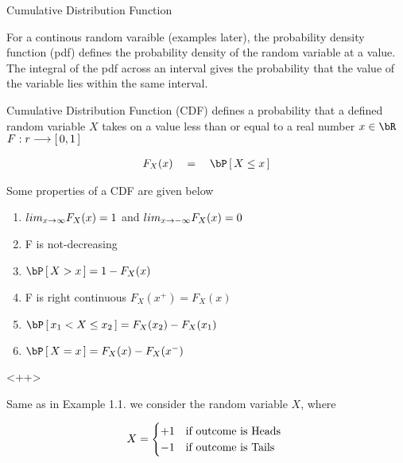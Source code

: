 \documentclass{article}
\begin{document}
\begin{ssection}{Cumulative Distribution Function}
	\begin{definition}
		For a continous random varaible (examples later), the probability density function (pdf) defines the probability density of the random variable at a value. The integral of the pdf across an interval gives the probability that the value of the variable lies within the same interval.
		\label{def:pdf}
	\end{definition}

	Cumulative Distribution Function (CDF) defines a probability that a defined random variable $X$ takes on a value less than or equal to a real number $x \in \bR$  $F : r \longrightarrow \left[\,{0, 1}\,\right]$

	\begin{align*}
		F_X(x)	\eq	\prob{X \le x}
	\end{align*}

	Some properties of a CDF are given below

	\begin{enumerate}
		\item $lim_{x \rightarrow \infty} F_X(x) = 1$ and $lim_{x \rightarrow -\infty} F_X(x) = 0$
		\item F is not-decreasing
		\item $\prob{X > x} = 1 - F_X(x)$
		\item F is right continuous  $F_X(x^+) = F_X(x)$
		\item $\prob{x_1 < X \le x_2} = F_X(x_2) - F_X(x_1)$
		\item $\prob{X = x} = F_X(x) - F_X(x^-)$
	\end{enumerate}


	<++>


	\begin{example}
		Same as in Example 1.1. we consider the random variable $X$, where

		\begin{align*}
			X = \begin{cases}
				+1	&	\text{if outcome is Heads}\,\, \\
				-1	&	\text{if outcome is Tails}\,\,
			\end{cases}
		\end{align*}


\end{example}
\end{ssection}
\end{document}

